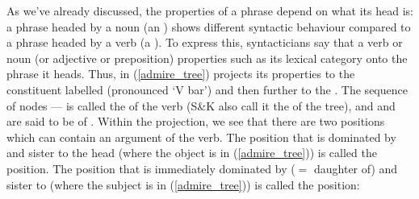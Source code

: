 \documentclass{article}
\begin{document}
As we've already discussed, the properties of a phrase depend on what its head is: a phrase headed by a noun (an ) shows different syntactic behaviour compared to a phrase headed by a verb (a ).
To express this, syntacticians say that a verb or noun (or adjective or preposition)  properties such as its lexical category onto the phrase it heads.
Thus, in (\ref{admire_tree})  projects its properties to the constituent labelled  (pronounced `V bar') and then further to the .
The sequence of nodes ---- is called the  of the verb (S\&K also call it the  of the tree), and  and  are said to be  of .
Within the  projection, we see that there are two positions which can contain an argument of the verb.
The position that is dominated by  and sister to the head  (where the object is in (\ref{admire_tree})) is called the  position.
The position that is immediately dominated by ($=$ daughter of)  and sister to  (where the subject is in (\ref{admire_tree})) is called the  position:
\z
\end{document}
